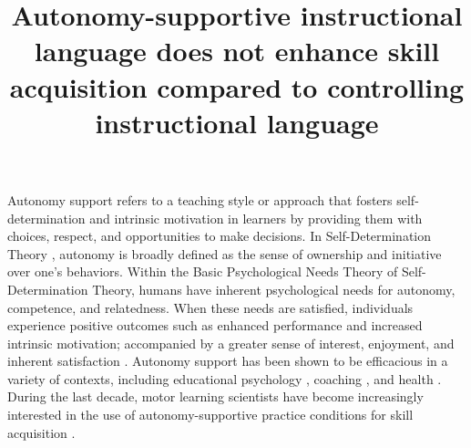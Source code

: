 \documentclass[man,floatsintext,donotrepeattitle,letterpaper,12pt]{apa7}
\title{Autonomy-supportive instructional language does not enhance skill acquisition compared to controlling instructional language}
\begin{document}
\maketitle

Autonomy support refers to a teaching style or approach that fosters self-determination and intrinsic motivation in learners by providing them with choices, respect, and opportunities to make decisions. In Self-Determination Theory \autocite{deci2012,ryan2020}, autonomy is broadly defined as the sense of ownership and initiative over one's behaviors. Within the Basic Psychological Needs Theory \autocite{ryan2000,ryan2017} of Self-Determination Theory, humans have inherent psychological needs for autonomy, competence, and relatedness. When these needs are satisfied, individuals experience positive outcomes such as enhanced performance and increased intrinsic motivation;  accompanied by a greater sense of interest, enjoyment, and inherent satisfaction \autocite{ryan2000}. Autonomy support has been shown to be efficacious in a variety of contexts, including educational psychology \autocites[see][for reviews]{reeve2009,ryan2020}[see][for a meta-analysis]{su2011}, coaching \autocite[see][for a meta-analysis]{mossman2022}, and health \autocite[see][for a meta-analysis]{okada2021}. During the last decade, motor learning scientists have become increasingly interested in the use of autonomy-supportive practice conditions for skill acquisition \autocite[see][for reviews]{sanli2013,stemarie2020,wulf2016}.
\end{document}

